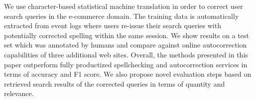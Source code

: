 We use character-based statistical machine translation in order to correct user search queries in the e-commerce domain. The training data is automatically extracted from event logs where users re-issue their search queries with potentially corrected spelling within the same session. We show results on a test set which was annotated by humans and compare against online autocorrection capabilities of three additional web sites. Overall, the methods presented in this paper outperform fully productized spellchecking and autocorrection services in terms of accuracy and F1 score. We also propose novel evaluation steps based on retrieved search results of the corrected queries in terms of quantity and relevance.
